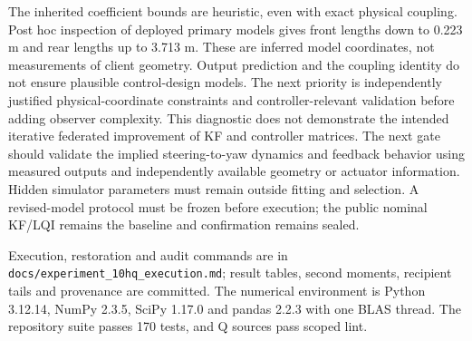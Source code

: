 The inherited coefficient bounds are heuristic, even with exact physical
coupling. Post hoc inspection of deployed primary models gives front lengths
down to 0.223 m and rear lengths up to 3.713 m. These are inferred model
coordinates, not measurements of client geometry. Output prediction and the
coupling identity do not ensure plausible control-design models. The next
priority is independently justified physical-coordinate constraints and
controller-relevant validation before adding observer complexity. This
diagnostic does not demonstrate the intended iterative federated improvement
of KF and controller matrices.
The next gate should validate the implied steering-to-yaw dynamics and feedback
behavior using measured outputs and independently available geometry or actuator
information. Hidden simulator parameters must remain outside fitting and
selection. A revised-model protocol must be frozen before execution; the public
nominal KF/LQI remains the baseline and confirmation remains sealed.

Execution, restoration and audit commands are in
\texttt{docs/experiment\_10hq\_execution.md}; result tables, second moments,
recipient tails and provenance are committed. The numerical environment is
Python 3.12.14, NumPy 2.3.5, SciPy 1.17.0 and pandas 2.2.3 with one BLAS thread.
The repository suite passes 170 tests, and Q sources pass scoped lint.
